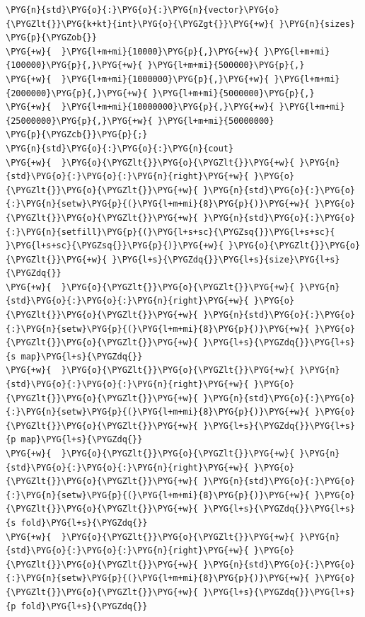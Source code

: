
\begin{codeblockbg}
\begin{Verbatim}[commandchars=\\\{\},breaklines=true,breakanywhere=true,fontsize=\codefont,xleftmargin=17bp]
\PYG{n}{std}\PYG{o}{:}\PYG{o}{:}\PYG{n}{vector}\PYG{o}{\PYGZlt{}}\PYG{k+kt}{int}\PYG{o}{\PYGZgt{}}\PYG{+w}{ }\PYG{n}{sizes}
\PYG{p}{\PYGZob{}}
\PYG{+w}{  }\PYG{l+m+mi}{10000}\PYG{p}{,}\PYG{+w}{ }\PYG{l+m+mi}{100000}\PYG{p}{,}\PYG{+w}{ }\PYG{l+m+mi}{500000}\PYG{p}{,}
\PYG{+w}{  }\PYG{l+m+mi}{1000000}\PYG{p}{,}\PYG{+w}{ }\PYG{l+m+mi}{2000000}\PYG{p}{,}\PYG{+w}{ }\PYG{l+m+mi}{5000000}\PYG{p}{,}
\PYG{+w}{  }\PYG{l+m+mi}{10000000}\PYG{p}{,}\PYG{+w}{ }\PYG{l+m+mi}{25000000}\PYG{p}{,}\PYG{+w}{ }\PYG{l+m+mi}{50000000}
\PYG{p}{\PYGZcb{}}\PYG{p}{;}
\PYG{n}{std}\PYG{o}{:}\PYG{o}{:}\PYG{n}{cout}
\PYG{+w}{  }\PYG{o}{\PYGZlt{}}\PYG{o}{\PYGZlt{}}\PYG{+w}{ }\PYG{n}{std}\PYG{o}{:}\PYG{o}{:}\PYG{n}{right}\PYG{+w}{ }\PYG{o}{\PYGZlt{}}\PYG{o}{\PYGZlt{}}\PYG{+w}{ }\PYG{n}{std}\PYG{o}{:}\PYG{o}{:}\PYG{n}{setw}\PYG{p}{(}\PYG{l+m+mi}{8}\PYG{p}{)}\PYG{+w}{ }\PYG{o}{\PYGZlt{}}\PYG{o}{\PYGZlt{}}\PYG{+w}{ }\PYG{n}{std}\PYG{o}{:}\PYG{o}{:}\PYG{n}{setfill}\PYG{p}{(}\PYG{l+s+sc}{\PYGZsq{}}\PYG{l+s+sc}{ }\PYG{l+s+sc}{\PYGZsq{}}\PYG{p}{)}\PYG{+w}{ }\PYG{o}{\PYGZlt{}}\PYG{o}{\PYGZlt{}}\PYG{+w}{ }\PYG{l+s}{\PYGZdq{}}\PYG{l+s}{size}\PYG{l+s}{\PYGZdq{}}
\PYG{+w}{  }\PYG{o}{\PYGZlt{}}\PYG{o}{\PYGZlt{}}\PYG{+w}{ }\PYG{n}{std}\PYG{o}{:}\PYG{o}{:}\PYG{n}{right}\PYG{+w}{ }\PYG{o}{\PYGZlt{}}\PYG{o}{\PYGZlt{}}\PYG{+w}{ }\PYG{n}{std}\PYG{o}{:}\PYG{o}{:}\PYG{n}{setw}\PYG{p}{(}\PYG{l+m+mi}{8}\PYG{p}{)}\PYG{+w}{ }\PYG{o}{\PYGZlt{}}\PYG{o}{\PYGZlt{}}\PYG{+w}{ }\PYG{l+s}{\PYGZdq{}}\PYG{l+s}{s map}\PYG{l+s}{\PYGZdq{}}
\PYG{+w}{  }\PYG{o}{\PYGZlt{}}\PYG{o}{\PYGZlt{}}\PYG{+w}{ }\PYG{n}{std}\PYG{o}{:}\PYG{o}{:}\PYG{n}{right}\PYG{+w}{ }\PYG{o}{\PYGZlt{}}\PYG{o}{\PYGZlt{}}\PYG{+w}{ }\PYG{n}{std}\PYG{o}{:}\PYG{o}{:}\PYG{n}{setw}\PYG{p}{(}\PYG{l+m+mi}{8}\PYG{p}{)}\PYG{+w}{ }\PYG{o}{\PYGZlt{}}\PYG{o}{\PYGZlt{}}\PYG{+w}{ }\PYG{l+s}{\PYGZdq{}}\PYG{l+s}{p map}\PYG{l+s}{\PYGZdq{}}
\PYG{+w}{  }\PYG{o}{\PYGZlt{}}\PYG{o}{\PYGZlt{}}\PYG{+w}{ }\PYG{n}{std}\PYG{o}{:}\PYG{o}{:}\PYG{n}{right}\PYG{+w}{ }\PYG{o}{\PYGZlt{}}\PYG{o}{\PYGZlt{}}\PYG{+w}{ }\PYG{n}{std}\PYG{o}{:}\PYG{o}{:}\PYG{n}{setw}\PYG{p}{(}\PYG{l+m+mi}{8}\PYG{p}{)}\PYG{+w}{ }\PYG{o}{\PYGZlt{}}\PYG{o}{\PYGZlt{}}\PYG{+w}{ }\PYG{l+s}{\PYGZdq{}}\PYG{l+s}{s fold}\PYG{l+s}{\PYGZdq{}}
\PYG{+w}{  }\PYG{o}{\PYGZlt{}}\PYG{o}{\PYGZlt{}}\PYG{+w}{ }\PYG{n}{std}\PYG{o}{:}\PYG{o}{:}\PYG{n}{right}\PYG{+w}{ }\PYG{o}{\PYGZlt{}}\PYG{o}{\PYGZlt{}}\PYG{+w}{ }\PYG{n}{std}\PYG{o}{:}\PYG{o}{:}\PYG{n}{setw}\PYG{p}{(}\PYG{l+m+mi}{8}\PYG{p}{)}\PYG{+w}{ }\PYG{o}{\PYGZlt{}}\PYG{o}{\PYGZlt{}}\PYG{+w}{ }\PYG{l+s}{\PYGZdq{}}\PYG{l+s}{p fold}\PYG{l+s}{\PYGZdq{}}

\end{Verbatim}
\end{codeblockbg}
